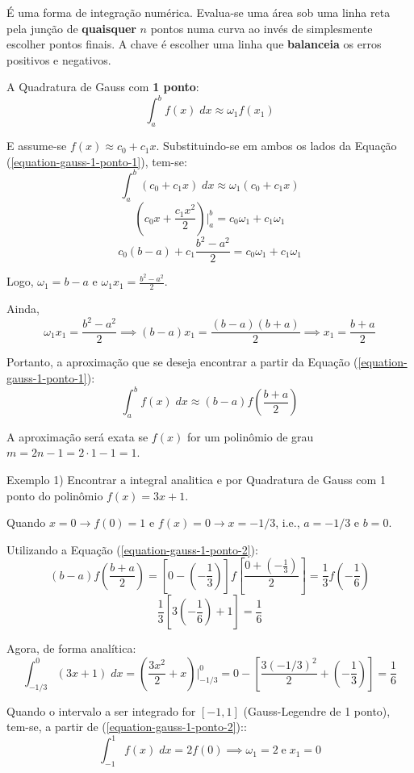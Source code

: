 É uma forma de integração numérica. Evalua-se uma área sob uma linha reta pela junção de \textbf{quaisquer} $n$ pontos numa curva ao invés de simplesmente escolher pontos finais. A chave é escolher uma linha que \textbf{balanceia} os erros positivos e negativos.

A Quadratura de Gauss com \textbf{1 ponto}:
\begin{equation}
	\label{equation-gauss-1-ponto-1}
	\int_{a}^b f(x)\;dx \approx \omega_1f(x_1)
\end{equation} 

E assume-se $f(x)\approx c_0+c_1x$. Substituindo-se em ambos os lados da Equação (\ref{equation-gauss-1-ponto-1}), tem-se:
\[ \int_{a}^b (c_0+c_1x)\;dx \approx \omega_1(c_0+c_1x) \]
\[ \left(c_0x+\frac{c_1x^2}{2}\right) \Bigg|_a^b = c_0\omega_1+c_1\omega_1 \]
\[ c_0(b-a)+c_1\frac{b^2-a^2}{2} = c_0\omega_1+c_1\omega_1 \]

Logo, $\omega_1=b-a$ e $\omega_1x_1=\displaystyle\frac{b^2-a^2}{2}$.

Ainda,
\[ \omega_1x_1=\displaystyle\frac{b^2-a^2}{2} \implies (b-a)x_1=\frac{(b-a)(b+a)}{2} \implies x_1=\frac{b+a}{2} \]

Portanto, a aproximação que se deseja encontrar a partir da Equação (\ref{equation-gauss-1-ponto-1}):
\begin{equation}
	\label{equation-gauss-1-ponto-2}
	\int_a^b f(x)\;dx \approx (b-a)f\left(\frac{b+a}{2}\right)
\end{equation}

A aproximação será exata se $f(x)$ for um polinômio de grau $m=2n-1=2\cdot1-1=1$.

Exemplo 1) Encontrar a integral analitica e por Quadratura de Gauss com 1 ponto do polinômio $f(x)=3x+1$.

Quando $x=0 \rightarrow f(0)=1$ e $f(x)=0\rightarrow x=-1/3$, i.e., $a=-1/3$ e $b=0$.

Utilizando a Equação (\ref{equation-gauss-1-ponto-2}):
\[ (b-a)f\left(\frac{b+a}{2}\right)= \left[0-\left(-\frac{1}{3}\right)\right] f\left[\frac{0+\left(-\frac{1}{3}\right)}{2}\right] =\frac{1}{3} f\left(-\frac{1}{6}\right) \]
\[ \frac{1}{3} \left[ 3\left(-\frac{1}{6}\right)+1 \right] = \frac{1}{6} \]

Agora, de forma analítica:
\[ \int_{-1/3}^0 (3x+1)\;dx = \left(\frac{3x^2}{2}+x\right)\Bigg|_{-1/3}^0 = 0-\left[ \frac{3(-1/3)^2}{2}+\left(-\frac{1}{3}\right) \right] =\frac{1}{6} \]

Quando o intervalo a ser integrado for $[-1,1]$ (Gauss-Legendre de 1 ponto), tem-se, a partir de (\ref{equation-gauss-1-ponto-2})::
\[ \int_{-1}^1f(x)\;dx=2f(0) \implies \omega_1=2\;\text{e}\;x_1=0 \]

